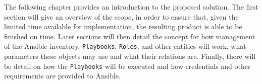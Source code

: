 The following chapter provides an introduction to the proposed solution.
The first section will give an overview of the scope, in order to ensure that, given the limited time available for implementation, the resulting product is able to be finished on time.
Later sections will then detail the concept for how management of the Ansible inventory, \texttt{Playbooks}, \texttt{Roles}, and other entities will work, what parameters these objects may use and what their relations are.
Finally, there will be detail on how the \texttt{Playbooks} will be executed and how credentials and other requirements are provided to Ansible.
